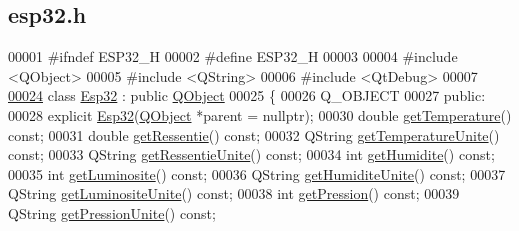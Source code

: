 \hypertarget{esp32_8h_source}{}\subsection{esp32.\+h}
\label{esp32_8h_source}

\begin{DoxyCode}
00001 \textcolor{preprocessor}{#ifndef ESP32\_H}
00002 \textcolor{preprocessor}{#define ESP32\_H}
00003 
00004 \textcolor{preprocessor}{#include <QObject>}
00005 \textcolor{preprocessor}{#include <QString>}
00006 \textcolor{preprocessor}{#include <QtDebug>}
00007 
\hypertarget{esp32_8h_source.tex_l00024}{}\hyperlink{class_esp32}{00024} \textcolor{keyword}{class }\hyperlink{class_esp32}{Esp32} : \textcolor{keyword}{public} \hyperlink{class_q_object}{QObject}
00025 \{
00026     Q\_OBJECT
00027 \textcolor{keyword}{public}:
00028     \textcolor{keyword}{explicit} \hyperlink{class_esp32_abf9de8dee58d0105a551455874f29c19}{Esp32}(\hyperlink{class_q_object}{QObject} *parent = \textcolor{keyword}{nullptr});          
00030     \textcolor{keywordtype}{double} \hyperlink{class_esp32_adb339413686f3d78df1ecd41f106fd4e}{getTemperature}() \textcolor{keyword}{const};                          
00031     \textcolor{keywordtype}{double} \hyperlink{class_esp32_ae29854a5127d760a216f96ec7d797412}{getRessentie}() \textcolor{keyword}{const};                            
00032     QString \hyperlink{class_esp32_ae20c976b79f87de083ca8ee49b2abf25}{getTemperatureUnite}() \textcolor{keyword}{const};                    
00033     QString \hyperlink{class_esp32_a548ed7533f742d087c65df256479ed00}{getRessentieUnite}() \textcolor{keyword}{const};                      
00034     \textcolor{keywordtype}{int} \hyperlink{class_esp32_a87f581ef8f01bcb71a7294cc545b242e}{getHumidite}() \textcolor{keyword}{const};                                
00035     \textcolor{keywordtype}{int} \hyperlink{class_esp32_aa2cdabace1ce70928c53d25e306a16d1}{getLuminosite}() \textcolor{keyword}{const};                              
00036     QString \hyperlink{class_esp32_ab2a1fc92c11af031814569f3d2836f33}{getHumiditeUnite}() \textcolor{keyword}{const};                       
00037     QString \hyperlink{class_esp32_a50f4ef373379d2dbc0fd960438ab6f93}{getLuminositeUnite}() \textcolor{keyword}{const};                     
00038     \textcolor{keywordtype}{int} \hyperlink{class_esp32_a31155a36108b37febae371d9ae65385a}{getPression}() \textcolor{keyword}{const};                                
00039     QString \hyperlink{class_esp32_a398d4a1cbc61f7af2f3af7ecbcf2f93f}{getPressionUnite}() \textcolor{keyword}{const};                       

\end{DoxyCode}
